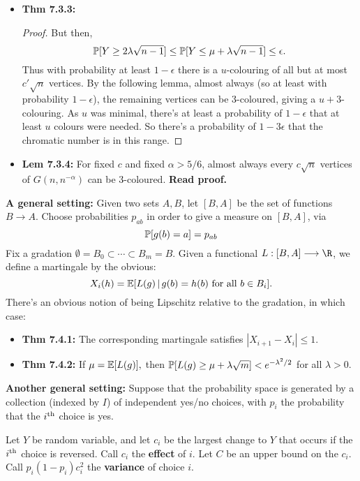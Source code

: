 \documentclass[11pt]{article}
\newenvironment{INT}[1][]{\begin{itemize}\small\item\textbf{#1}}{\end{itemize}}
\newcommand{\moreINT}[1][]{\item\textbf{#1}}
\begin{document}
\begin{chapter7}
\begin{itemise}
\begin{INT}[Thm 7.3.3:]
\begin{proof}
But then,
\[\operatorname{\mathbb{P}}[Y\geq2\lambda\sqrt{n-1}]\leq\operatorname{\mathbb{P}}[Y\leq\mu+\lambda\sqrt{n-1}]\leq\epsilon.\]
Thus with probability at least $1-\epsilon$ there is a $u$-colouring of all but at most $c'\sqrt n$ vertices. By the following lemma, almost always (so at least with probability $1-\epsilon$), the remaining vertices can be 3-coloured, giving a $u+3$-colouring. As $u$ was minimal, there's at least a probability of $1-\epsilon$ that at least $u$ colours were needed. So there's a probability of $1-3\epsilon$ that the chromatic number is in this range.
\end{proof}
\moreINT[Lem 7.3.4:] For fixed $c$ and fixed $\alpha>5/6$, almost always every $c\sqrt n$ vertices of $G(n,n^{-\alpha})$ can be 3-coloured. \textbf{Read proof.}
\end{INT}

\item \textbf{A general setting:}
Given two sets $A,B$, let $[B,A]$ be the set of functions $B\to A$. Choose probabilities $p_{ab}$ in order to give a measure on {$[B,A]$}, via
\[\operatorname{\mathbb{P}}[g(b)=a]=p_{ab}\]
Fix a gradation $\emptyset=B_0\subset\cdots\subset B_m=B$. Given a functional $L:[B,A]\to \R$, we define a martingale by the obvious:
\[X_i(h)=\operatorname{\mathbb{E}}[L(g)\,|\,g(b)=h(b)\textup{ for all }b\in B_i].\]
There's an obvious notion of being Lipschitz relative to the gradation, in which case:
\begin{INT}[Thm 7.4.1:]
The corresponding martingale satisfies $|X_{i+1}-X_i|\leq1$.
\moreINT[Thm 7.4.2:]
If $\mu=\operatorname{\mathbb{E}}[L(g)],$ then $\operatorname{\mathbb{P}}[L(g)\geq\mu+\lambda\sqrt m]<e^{-\lambda^2/2}$ for all $\lambda>0$.
\end{INT}
\item \textbf{Another general setting:}
Suppose that the probability space is generated by a collection (indexed by $I$) of independent yes/no choices, with $p_i$ the probability that the $i^\textup{th}$ choice is yes.

\INDENT Let $Y$ be random variable, and let $c_i$ be the largest change to $Y$ that occurs if the $i^\textup{th}$ choice is reversed. Call $c_i$ the \textbf{effect} of $i$. Let $C$ be an upper bound on the $c_i$. Call $p_i(1-p_i)c_i^2$ the \textbf{variance} of choice $i$.


\end{itemise}
\end{chapter7}
\end{document}

